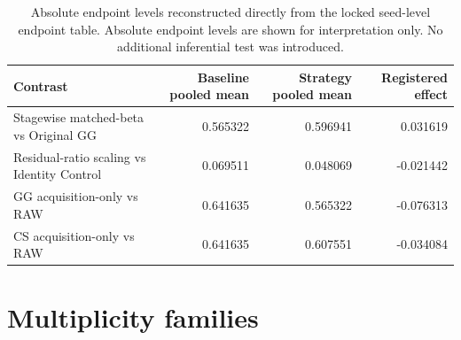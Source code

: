 \documentclass[10pt]{article}
\begin{document}
\begin{table}[htbp]
\centering
\caption{Absolute endpoint levels reconstructed directly from the locked
seed-level endpoint table. Absolute endpoint levels are shown for
interpretation only. No additional inferential test was introduced.}
\scriptsize
\begin{tabular}{lrrr}
\toprule
Contrast & Baseline pooled mean & Strategy pooled mean & Registered effect\\
\midrule
Stagewise matched-beta vs Original GG & 0.565322 & 0.596941 & 0.031619\\
Residual-ratio scaling vs Identity Control & 0.069511 & 0.048069 & -0.021442\\
GG acquisition-only vs RAW & 0.641635 & 0.565322 & -0.076313\\
CS acquisition-only vs RAW & 0.641635 & 0.607551 & -0.034084\\
\bottomrule
\end{tabular}
\end{table}

\section{Multiplicity families}
\end{document}
